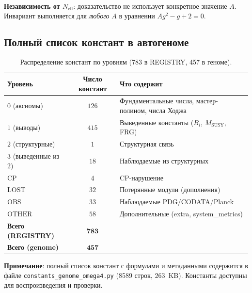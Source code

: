 \documentclass[11pt,a4paper]{article}
\theoremstyle{definition}
\begin{document}
\medskip\noindent
\textbf{Независимость от $N_{\text{eff}}$}: доказательство
не использует конкретное значение $A$. Инвариант выполняется
для \emph{любого} $A$ в уравнении $Ag^2 - g + 2 = 0$.

\subsection{Полный список констант в автогеноме}
\label{app:frg-genome-summary}

\begin{table}[ht]
\centering
\caption{Распределение констант по уровням (783 в REGISTRY, 457 в геноме).}
\label{tab:app-genome-summary}
\begin{tabular}{lcl}
\toprule
Уровень & Число констант & Что содержит \\
\midrule
$0$ (аксиомы) & $126$ & Фундаментальные числа, мастер-полином, числа Ходжа \\
$1$ (выводы) & $415$ & Выведенные константы ($B_i$, $M_{\text{SUSY}}$, FRG) \\
$2$ (структурные) & $1$ & Структурная связь \\
$3$ (выведенные из 2) & $18$ & Наблюдаемые из структурных \\
$\text{CP}$ & $4$ & CP-нарушение \\
$\text{LOST}$ & $32$ & Потерянные модули (дополнения) \\
$\text{OBS}$ & $33$ & Наблюдаемые PDG/CODATA/Planck \\
$\text{OTHER}$ & $58$ & Дополнительные (extra, system\_metrics) \\
\midrule
\textbf{Всего (REGISTRY)} & $\mathbf{783}$ & \\
\textbf{Всего (genome)} & $\mathbf{457}$ & \\
\bottomrule
\end{tabular}
\end{table}

\medskip\noindent
\textbf{Примечание}: полный список констант с формулами и
метаданными содержится в файле \texttt{constants\_genome\_omega4.py}
(8589 строк, 263~KB). Константы доступны для воспроизведения
и проверки.

\end{document}
